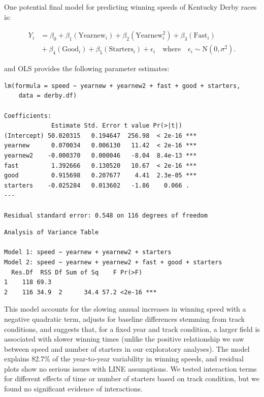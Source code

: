 \documentclass[
]{krantz}
\begin{document}
One potential final model for predicting winning speeds of Kentucky Derby races is:

\begin{equation}
\begin{split}
 Y_{i}&=\beta_{0}+\beta_{1}(\textrm{Yearnew}_{i})+\beta_{2}(\textrm{Yearnew}^2_{i})+\beta_{3}(\textrm{Fast}_{i})\\
      &{}+\beta_{4}(\textrm{Good}_{i})+\beta_{5}(\textrm{Starters}_{i})+\epsilon_{i}\quad 
      \textrm{where}\quad \epsilon_{i}\sim \textrm{N}(0,\sigma^2).
\end{split}
\label{eq:model0}
\end{equation}

and OLS provides the following parameter estimates:

\begin{verbatim}
lm(formula = speed ~ yearnew + yearnew2 + fast + good + starters, 
    data = derby.df)

Coefficients:
             Estimate Std. Error t value Pr(>|t|)    
(Intercept) 50.020315   0.194647  256.98  < 2e-16 ***
yearnew      0.070034   0.006130   11.42  < 2e-16 ***
yearnew2    -0.000370   0.000046   -8.04  8.4e-13 ***
fast         1.392666   0.130520   10.67  < 2e-16 ***
good         0.915698   0.207677    4.41  2.3e-05 ***
starters    -0.025284   0.013602   -1.86    0.066 .  
---

Residual standard error: 0.548 on 116 degrees of freedom
\end{verbatim}

\begin{verbatim}
Analysis of Variance Table

Model 1: speed ~ yearnew + yearnew2 + starters
Model 2: speed ~ yearnew + yearnew2 + fast + good + starters
  Res.Df  RSS Df Sum of Sq    F Pr(>F)    
1    118 69.3                             
2    116 34.9  2      34.4 57.2 <2e-16 ***
\end{verbatim}

This model accounts for the slowing annual increases in winning speed with a negative quadratic term, adjusts for baseline differences stemming from track conditions, and suggests that, for a fixed year and track condition, a larger field is associated with slower winning times (unlike the positive relationship we saw between speed and number of starters in our exploratory analyses). The model explains 82.7\% of the year-to-year variability in winning speeds, and residual plots show no serious issues with LINE assumptions. We tested interaction terms for different effects of time or number of starters based on track condition, but we found no significant evidence of interactions.
\end{document}
